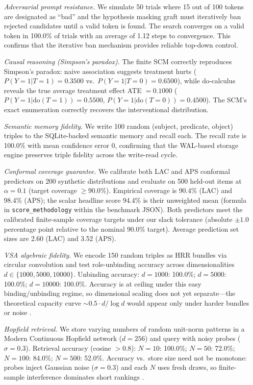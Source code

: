 \textit{Adversarial prompt resistance.} We simulate 50 trials where 15 out of 100 tokens are designated as ``bad'' and the hypothesis masking graft must iteratively ban rejected candidates until a valid token is found. The search converges on a valid token in 100.0\% of trials with an average of 1.12 steps to convergence. 
This confirms that the iterative ban mechanism provides reliable top-down control.

\textit{Causal reasoning (Simpson's paradox).} The finite SCM correctly reproduces Simpson's paradox: naive association suggests treatment hurts ($P(Y{=}1 | T{=}1) = 0.3500$ vs.\ $P(Y{=}1 | T{=}0) = 0.6500$), while do-calculus reveals the true average treatment effect ATE $= 0.1000$ ($P(Y{=}1 | \mathrm{do}(T{=}1)) = 0.5500$, $P(Y{=}1 | \mathrm{do}(T{=}0)) = 0.4500$). 
The SCM's exact enumeration correctly recovers the interventional distribution.

\textit{Semantic memory fidelity.} We write 100 random (subject, predicate, object) triples to the SQLite-backed semantic memory and recall each. The recall rate is 100.0\% with mean confidence error $0$, confirming that the WAL-based storage engine preserves triple fidelity across the write-read cycle.

\textit{Conformal coverage guarantee.} We calibrate both LAC and APS conformal predictors on 200 synthetic distributions and evaluate on 500 held-out items at $\alpha = 0.1$ (target coverage $\geq 90.0\%$). Empirical coverage is 90.4\% (LAC) and 98.4\% (APS); the scalar headline score 94.4\% is their unweighted mean (formula in \texttt{score\_methodology} within the benchmark JSON). 
Both predictors meet the calibrated finite-sample coverage targets under our slack tolerance (absolute $\pm 1.0$ percentage point relative to the nominal $90.0\%$ target). Average prediction set sizes are 2.60 (LAC) and 3.52 (APS).

\textit{VSA algebraic fidelity.} We encode 150 random triples as HRR bundles via circular convolution and test role-unbinding accuracy across dimensionalities $d \in \{1000, 5000, 10000\}$. 
Unbinding accuracy: $d = 1000$: 100.0\%; $d = 5000$: 100.0\%; $d = 10000$: 100.0\%. 
Accuracy is at ceiling under this easy binding/unbinding regime, so dimensional scaling does not yet separate---the theoretical capacity curve $\sim 0.5 \cdot d / \log d$ would appear only under harder bundles or noise \cite{Plate2003,plate1995hrr}. 

\textit{Hopfield retrieval.} We store varying numbers of random unit-norm patterns in a Modern Continuous Hopfield network ($d = 256$) and query with noisy probes ($\sigma = 0.3$). 
Retrieval accuracy (cosine $> 0.8$): $N = 10$: 100.0\%; $N = 50$: 72.0\%; $N = 100$: 84.0\%; $N = 500$: 52.0\%. 
Accuracy vs.\ store size need not be monotone: probes inject Gaussian noise ($\sigma = 0.3$) and each $N$ uses fresh draws, so finite-sample interference dominates short rankings \cite{Ramsauer2020}. 

